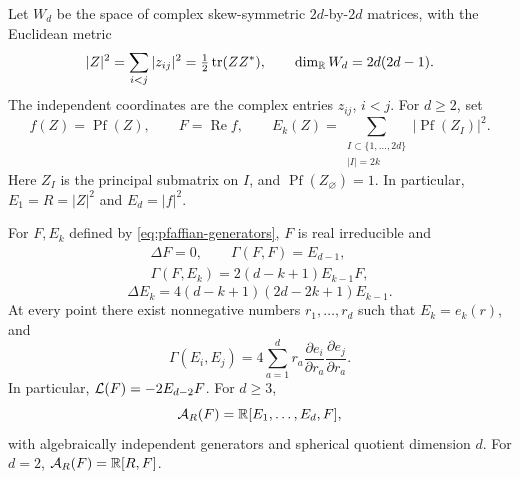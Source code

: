 Let \(W_d\) be the space of complex skew-symmetric \(2d\)-by-\(2d\)
matrices, with the Euclidean metric
\begin{equation}\label{eq:pfaffian-metric}
 |Z|^2=\sum_{i<j}|z_{ij}|^2=\tfrac12\operatorname{tr}(ZZ^*),
 \qquad \dim_{\mathbb R}W_d=2d(2d-1).
\end{equation}
The independent coordinates are the complex entries \(z_{ij}\),
\(i<j\).  For \(d\ge2\), set
\begin{equation}\label{eq:pfaffian-generators}
 f(Z)=\operatorname{Pf}(Z),\qquad F=\operatorname{Re}f,
 \qquad E_k(Z)=\sum_{\substack{I\subset\{1,\ldots,2d\}\\|I|=2k}}
                 |\operatorname{Pf}(Z_I)|^2.
\end{equation}
Here \(Z_I\) is the principal submatrix on \(I\), and
\(\operatorname{Pf}(Z_\varnothing)=1\).
In particular, \(E_1=R=|Z|^2\) and \(E_d=|f|^2\).

\begin{proposition}
\label{prop:pfaffian-closure}
For \(F,E_k\) defined by \eqref{eq:pfaffian-generators}, \(F\) is
real irreducible and
\begin{equation}\label{eq:pfaffian-F-closure}
\begin{gathered}
 \Delta F=0,\qquad\Gamma(F,F)=E_{d-1},\\
 \Gamma(F,E_k)=2(d-k+1)E_{k-1}F,
\end{gathered}
\end{equation}
\begin{equation}\label{eq:pfaffian-Laplacian}
 \Delta E_k=4(d-k+1)(2d-2k+1)E_{k-1}.
\end{equation}
At every point there exist nonnegative numbers \(r_1,\ldots,r_d\)
such that \(E_k=e_k(r)\), and
\begin{equation}\label{eq:pfaffian-Gamma}
 \Gamma(E_i,E_j)=4\sum_{a=1}^d r_a
       \frac{\partial e_i}{\partial r_a}
       \frac{\partial e_j}{\partial r_a}.
\end{equation}
In particular, \(\mathcal L(F)=-2E_{d-2}F\).
For \(d\ge3\),
\begin{equation}\label{eq:pfaffian-smallest-algebra}
 \mathcal A_R(F)=\mathbb R[E_1,\ldots,E_d,F],
\end{equation}
with algebraically independent generators and spherical quotient
dimension \(d\).  For \(d=2\), \(\mathcal A_R(F)=\mathbb R[R,F]\).
\end{proposition}


